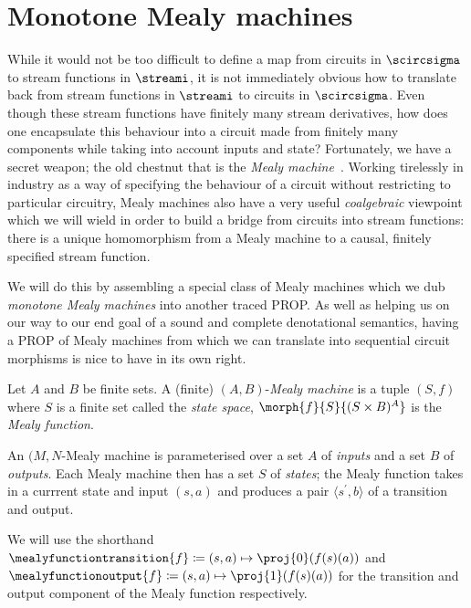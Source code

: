 \section{Monotone Mealy machines}

While it would not be too difficult to define a map from circuits in
\(\scircsigma\) to stream functions in \(\streami\), it is not immediately
obvious how to translate back from stream functions in \(\streami\) to circuits
in \(\scircsigma\).
Even though these stream functions have finitely many stream derivatives, how
does one encapsulate this behaviour into a circuit made from finitely many
components while taking into account inputs and state?
Fortunately, we have a secret weapon; the old chestnut that is the
\emph{Mealy machine}~\cite{mealy1955method}.
Working tirelessly in industry as a way of specifying the behaviour of a
circuit without restricting to particular circuitry, Mealy machines also have
a very useful \emph{coalgebraic} viewpoint which we will wield in order to
build a bridge from circuits into stream functions: there is a unique
homomorphism from a Mealy machine to a causal, finitely specified stream
function.

We will do this by assembling a special class of Mealy machines which we dub
\emph{monotone Mealy machines} into another traced PROP.
As well as helping us on our way to our end goal of a sound and complete
denotational semantics, having a PROP of Mealy machines from which we can
translate into sequential circuit morphisms is nice to have in its own right.

\begin{definition}\label{def:mealy}
    Let \(A\) and \(B\) be finite sets.
    A (finite) \((A,B)\)-\emph{Mealy machine} is a tuple \((S, f)\) where
    \(S\) is a finite set called the \emph{state space},
    \(\morph{f}{S}{(S \times B)^A}\) is the \emph{Mealy function}.
\end{definition}

An \((M,N\)-Mealy machine is parameterised over a set \(A\) of \emph{inputs} and
a set \(B\) of \emph{outputs}.
Each Mealy machine then has a set \(S\) of \emph{states}; the Mealy function
takes in a currrent state and input \((s, a)\) and produces a pair
\(\langle{s^\prime, b}\rangle\) of a transition and output.

\begin{notation}
    We will use the shorthand \(
    \mealyfunctiontransition{f} \coloneqq (s, a) \mapsto \proj{0}(f(s)(a))
\) and \(
    \mealyfunctionoutput{f} \coloneqq (s, a) \mapsto \proj{1}(f(s)(a))
\) for the transition and output component of the Mealy function respectively.
\end{notation}

